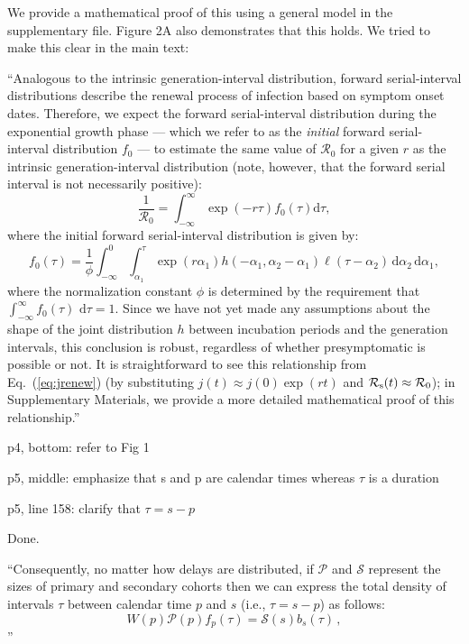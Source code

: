 \documentclass[12pt]{article}
\newcommand{\eref}[1]{Eq.~(\ref{eq:#1})}
\newcommand{\Rx}[1]{\ensuremath{{\cal R}_{#1}}}
\newcommand{\Ro}{\ensuremath{{\mathcal R}_{0}}\xspace}
\newcommand{\Rs}{\Rx{\mathrm{s}}}
\newcommand{\dd}[1]{\ensuremath{\, \mathrm{d}#1}}
\newcommand{\dtau}{\dd{\tau}}
\newcommand{\revtext}{\textsf}
\newcommand{\psymp}{\ensuremath{p}} %
\newcommand{\ssymp}{\ensuremath{s}} %
\newcommand{\pinf}{\ensuremath{\alpha_1}} %
\newcommand{\sinf}{\ensuremath{\alpha_2}} %
\newcommand{\psize}{{\mathcal P}} %
\newcommand{\ssize}{{\mathcal S}} %
\newcommand{\idist}{\ell} %
\begin{document}
We provide a mathematical proof of this using a general model in the supplementary file. Figure 2A also demonstrates that this holds. We tried to make this clear in the main text:

``Analogous to the intrinsic generation-interval distribution, 
forward serial-interval distributions describe the renewal process of infection based on symptom onset dates.
Therefore, we expect the forward serial-interval distribution during the exponential growth phase --- which we refer to as the \emph{initial} forward serial-interval distribution $f_0$ --- to estimate the same value of \Ro for a given $r$ as the intrinsic generation-interval distribution (note, however, that the forward serial interval is not necessarily positive):
\begin{equation}
\frac{1}{\Ro} = \int_{-\infty}^\infty \exp(-r\tau) f_{0}(\tau) \mathrm{d} \tau,
\label{eq:Rforward}
\end{equation}
where the initial forward serial-interval distribution is given by:
\begin{equation}
f_{0}(\tau) = \frac{1}{\phi} \int_{-\infty}^{0} \int_{\pinf}^{\tau} \exp(r \pinf) h(-\pinf, \sinf - \pinf) \idist(\tau - \sinf) \, \mathrm{d}\sinf\,\mathrm{d}\pinf,
\label{eq:initialSI}
\end{equation}
where the normalization constant $\phi$ is determined by the
requirement that $\int_{-\infty}^\infty f_{0}(\tau)\,\dtau=1$.
Since we have not yet made any assumptions about the shape of the joint distribution $h$ between incubation periods and the generation intervals, this conclusion is robust, regardless of whether presymptomatic is possible or not.
It is straightforward to see this relationship from \eref{jrenew} (by substituting $j(t) \approx j(0) \exp(rt)$ and $\Rs(t) \approx \Ro$);
in Supplementary Materials, we provide a more detailed mathematical proof of this relationship.''

\revtext{p4, bottom: refer to Fig 1 }



\revtext{p5, middle: emphasize that s and p are calendar times whereas $\tau$ is a duration }

\revtext{p5, line 158: clarify that $\tau = s-p$}

Done.

``Consequently, no matter how delays are distributed, if
$\mathcal P$ and $\mathcal S$ represent the sizes of primary and
secondary cohorts then we can express the total density of intervals $\tau$ between calendar time $\psymp$ and $\ssymp$ (i.e., $\tau=\ssymp-\psymp$) as follows:
\begin{equation}
W(\psymp) \psize(\psymp) f_\psymp(\tau) = \ssize(\ssymp) b_\ssymp(\tau) \,,
\label{eq:match}
\end{equation}''
\end{document}
